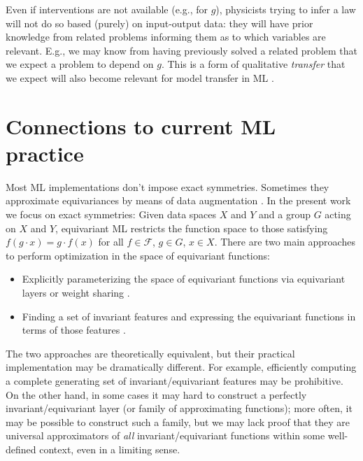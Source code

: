 \documentclass{article}
\theoremstyle{plain}
\theoremstyle{definition}
\theoremstyle{remark}
\begin{document}
Even if interventions are not available (e.g., for $g$), physicists trying to infer a law will not do so based (purely) on input-output data: they will have prior knowledge from related problems informing them as to which variables are relevant. E.g., we may know from having previously solved a related problem that we expect a problem to depend on $g$.
This is a form of qualitative {\em transfer} that we expect will also become relevant for model transfer in ML \cite{RojSchTurPet18}.

\section{Connections to current ML practice}\label{sec:practice}

Most ML implementations don't impose exact symmetries. Sometimes they approximate equivariances by means of data augmentation \cite{chen2020group, huang2022quantifying}.
In the present work we focus on exact symmetries: Given data spaces $X$ and $Y$ and a group $G$ acting on $X$ and $Y$, equivariant ML restricts the function space to those satisfying  $f(g\cdot x) = g \cdot f(x)$ for all $f\in \mathcal F$, $g\in G$, $x\in X$.
There are two main approaches to perform optimization in the space of equivariant functions:
\vspace{-1.5ex}\begin{itemize}
\parskip
\topsep 0pt
\partopsep 0pt
\parskip 0pt
    \item Explicitly parameterizing the space of equivariant functions via equivariant layers or weight sharing \cite{cohen2016group, kondor2018convolution, thomas2018tensor, geiger2022e3nn, finzi2020generalizing, finzi2021practical}.
    \item Finding a set of invariant features and expressing the equivariant functions in terms of those features \cite{villar2021scalars,blum2022equivariant}.
\end{itemize}\vspace{-1.5ex}
The two approaches are theoretically equivalent, but their practical implementation may be dramatically different. For example, efficiently computing a complete generating set of invariant/equivariant features may be prohibitive. On the other hand, in some cases it may hard to construct a perfectly invariant/equivariant layer (or family of approximating functions); more often, it may be possible to construct such a family, but we may lack proof that they are universal approximators of \textit{all} invariant/equivariant functions within some well-defined context, even in a limiting sense.
\end{document}
